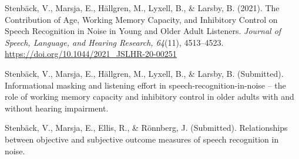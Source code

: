 \documentclass[]{article}
\begin{document}
Stenbäck, V., Marsja, E., Hällgren, M., Lyxell, B., \& Larsby, B.
(2021). The Contribution of Age, Working Memory Capacity, and Inhibitory
Control on Speech Recognition in Noise in Young and Older Adult
Listeners. \emph{Journal of Speech, Language, and Hearing Research,
64}(11), 4513--4523. \url{https://doi.org/10.1044/2021_JSLHR-20-00251}

Stenbäck, V., Marsja, E., Hällgren, M., Lyxell, B., \& Larsby, B.
(Submitted). Informational masking and listening effort in
speech-recognition-in-noise -- the role of working memory capacity and
inhibitory control in older adults with and without hearing impairment.

Stenbäck, V., Marsja, E., Ellis, R., \& Rönnberg, J. (Submitted).
Relationships between objective and subjective outcome measures of
speech recognition in noise.
\end{document}

